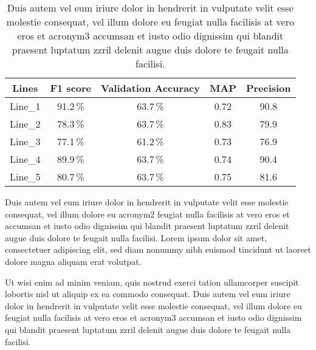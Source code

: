 \begin{table}[H]\scriptsize
\centering
\begin{tabular}{c|cccc}
     Lines& F1 score&Validation Accuracy&MAP &Precision\\
    \hline
    Line\_1	& 91.2\,\%	& 63.7\,\%	& 0.72  &90.8\\
    Line\_2	& 78.3\,\%	& 63.7\,\%	& 0.83 &79.9\\
    Line\_3	& 77.1\,\%	& 61.2\,\%	& 0.73  &76.9\\
    Line\_4 & 89.9\,\%	& 63.7\,\%	& 0.74  &90.4\\
    Line\_5 & 80.7\,\% & 63.7\,\%  & 0.75 &81.6\\ 
\end{tabular}
\caption{Duis autem vel eum iriure dolor in hendrerit in vulputate velit esse molestie consequat, vel illum dolore eu feugiat nulla facilisis at vero eros et \acrfull{acronym3} accumsan et iusto odio dignissim qui blandit praesent luptatum zzril delenit augue duis dolore te feugait nulla facilisi.}
\label{tab:results}
\end{table}

Duis autem vel eum iriure dolor in hendrerit in vulputate velit esse molestie consequat, vel illum dolore eu \acrfull{acronym2} feugiat nulla facilisis at vero eros et accumsan et iusto odio dignissim qui blandit praesent luptatum zzril delenit augue duis dolore te feugait nulla facilisi. Lorem ipsum dolor sit amet, consectetuer adipiscing elit, sed diam nonummy nibh euismod tincidunt ut laoreet dolore magna aliquam erat volutpat. 

Ut wisi enim ad minim veniam, quis nostrud exerci tation ullamcorper suscipit lobortis nisl ut aliquip ex ea commodo consequat. Duis autem vel eum iriure dolor in hendrerit in vulputate velit esse molestie consequat, vel illum dolore eu feugiat nulla facilisis at vero eros et \acrfull{acronym3} accumsan et iusto odio dignissim qui blandit praesent luptatum zzril delenit augue duis dolore te feugait nulla facilisi.

